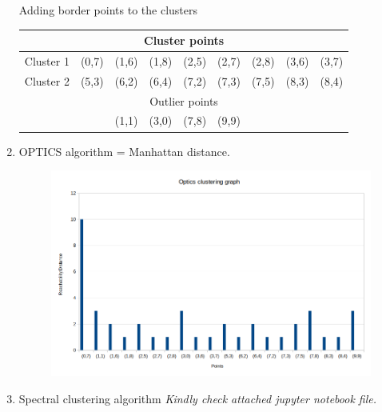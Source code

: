 \documentclass[10pt,a4paper]{article}
\begin{document}
\begin{enumerate}
			Adding border points to the clusters
			
			\begin{table}[h!]
				\centering
				\begin{tabular}{c|cccccccc}
					\toprule
					\multicolumn{9}{c}{Cluster points} \\ \midrule
					Cluster 1 & (0,7) & (1,6) & (1,8) & (2,5) & (2,7) & (2,8) & (3,6) & (3,7) \\
					Cluster 2 & (5,3) & (6,2) & (6,4) & (7,2) & (7,3) & (7,5) & (8,3) & (8,4) \\
					\hline \hline
					\multicolumn{9}{c}{Outlier points} \\ \midrule
					\multicolumn{2}{c}{} & (1,1) & (3,0) & (7,8) & (9,9) & & & \\ 
					\bottomrule
				\end{tabular}
			\end{table}
			
			
		
		\clearpage
		\item OPTICS algorithm \newline
			 = Manhattan distance. \newline
			\begin{figure}[h!]
				\centering
				\includegraphics[scale=0.45]{optics.png}
			\end{figure}
		
		
		\clearpage
		\item Spectral clustering algorithm \newline
			\textit{Kindly check attached jupyter notebook file.}
			
			
			
	\end{enumerate}
	
\end{document}

